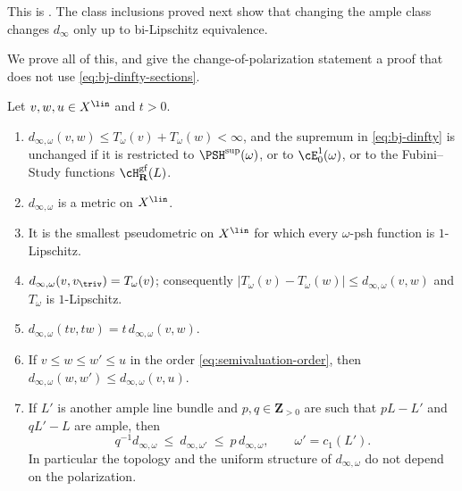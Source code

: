 This is \cite[Lemma~11.7]{BJ22}.  The class inclusions proved next
show that changing the ample class changes $d_\infty$ only up to
bi-Lipschitz equivalence.

We prove all of this, and give the change-of-polarization statement a proof
that does not use \eqref{eq:bj-dinfty-sections}.

\begin{proposition}
\label{prop:ch49-dinfty-basic}
Let $v,w,u\in X^{\lin}$ and $t>0$.
\begin{enumerate}
\item\label{itm:ch49-dinf:finite}
      $d_{\infty,\omega}(v,w)\le T_\omega(v)+T_\omega(w)<\infty$, and the
      supremum in \eqref{eq:bj-dinfty} is unchanged if it is restricted to
      $\PSH^{\sup}(\omega)$, or to $\cE^1_0(\omega)$, or to the
      Fubini--Study functions $\cH^{\mathrm{gf}}_{\mathbf R}(L)$.
\item\label{itm:ch49-dinf:metric}
      $d_{\infty,\omega}$ is a metric on $X^{\lin}$.
\item\label{itm:ch49-dinf:smallest}
      It is the smallest pseudometric on $X^{\lin}$ for which every
      $\omega$-psh function is $1$-Lipschitz.
\item\label{itm:ch49-dinf:vertex}
      $d_{\infty,\omega}(v,v_{\triv})=T_\omega(v)$; consequently
      $|T_\omega(v)-T_\omega(w)|\le d_{\infty,\omega}(v,w)$ and
      $T_\omega$ is $1$-Lipschitz.
\item\label{itm:ch49-dinf:homog}
      $d_{\infty,\omega}(tv,tw)=t\,d_{\infty,\omega}(v,w)$.
\item\label{itm:ch49-dinf:monotone}
      If $v\le w\le w'\le u$ in the order
      \eqref{eq:semivaluation-order}, then
      $d_{\infty,\omega}(w,w')\le d_{\infty,\omega}(v,u)$.
\item\label{itm:ch49-dinf:polarization}
      If $L'$ is another ample line bundle and $p,q\in\mathbf Z_{>0}$
      are such that $pL-L'$ and $qL'-L$ are ample, then
      \[
       q^{-1}d_{\infty,\omega}\ \le\ d_{\infty,\omega'}\ \le\
       p\,d_{\infty,\omega},
       \qquad \omega'=c_1(L') .
      \]
      In particular the topology and the uniform structure of
      $d_{\infty,\omega}$ do not depend on the polarization.
\end{enumerate}
\end{proposition}

